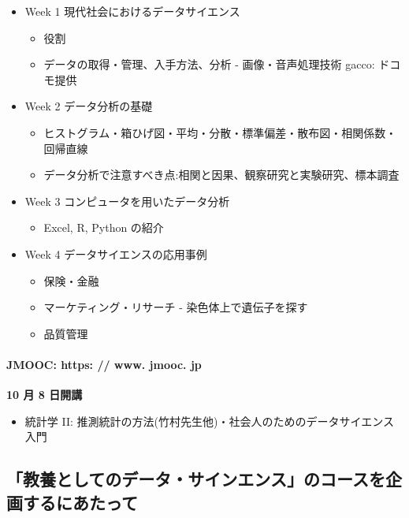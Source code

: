 \documentclass[
]{book}
\providecommand{\tightlist}{%
  \setlength{\itemsep}{0pt}\setlength{\parskip}{0pt}}
\theoremstyle{definition}
\theoremstyle{definition}
\theoremstyle{definition}
\theoremstyle{definition}
\theoremstyle{remark}
\begin{document}
\begin{itemize}
\tightlist
\item
  Week 1 現代社会におけるデータサイエンス

  \begin{itemize}
  \tightlist
  \item
    役割
  \item
    データの取得・管理、入手方法、分析 - 画像・音声処理技術
    gacco: ドコモ提供
  \end{itemize}
\item
  Week 2 データ分析の基礎

  \begin{itemize}
  \tightlist
  \item
    ヒストグラム・箱ひげ図・平均・分散・標準偏差・散布図・相関係数・回帰直線
  \item
    データ分析で注意すべき点:相関と因果、観察研究と実験研究、標本調査
  \end{itemize}
\item
  Week 3 コンピュータを用いたデータ分析

  \begin{itemize}
  \tightlist
  \item
    Excel, R, Python の紹介
  \end{itemize}
\item
  Week 4 データサイエンスの応用事例

  \begin{itemize}
  \tightlist
  \item
    保険・金融
  \item
    マーケティング・リサーチ - 染色体上で遺伝子を探す
  \item
    品質管理
  \end{itemize}
\end{itemize}

\hypertarget{jmooc-https-www.-jmooc.-jp}{%
\paragraph{JMOOC: https: // www. jmooc. jp}\label{jmooc-https-www.-jmooc.-jp}}

\textbf{10 月 8 日開講}

\begin{itemize}
\tightlist
\item
  統計学 II: 推測統計の方法(竹村先生他)・社会人のためのデータサイエンス入門
\end{itemize}

\hypertarget{ux6559ux990aux3068ux3057ux3066ux306eux30c7ux30fcux30bfux30b5ux30a4ux30f3ux30a8ux30f3ux30b9ux306eux30b3ux30fcux30b9ux3092ux4f01ux753bux3059ux308bux306bux3042ux305fux3063ux3066}{%
\subsection{「教養としてのデータ・サインエンス」のコースを企画するにあたって}\label{ux6559ux990aux3068ux3057ux3066ux306eux30c7ux30fcux30bfux30b5ux30a4ux30f3ux30a8ux30f3ux30b9ux306eux30b3ux30fcux30b9ux3092ux4f01ux753bux3059ux308bux306bux3042ux305fux3063ux3066}}
\end{document}
